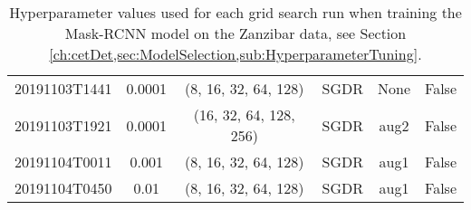 \begin{table}[!ht]
\begin{adjustbox}{width=\columnwidth, center}
\begin{tabular}{cccccc}
			20191103T1441 &       0.0001 &     (8, 16, 32, 64, 128) &      SGDR &                  None &                  False \\
			20191103T1921 &       0.0001 &   (16, 32, 64, 128, 256) &      SGDR &                  aug2 &                  False \\
			20191104T0011 &        0.001 &     (8, 16, 32, 64, 128) &      SGDR &                  aug1 &                  False \\
			20191104T0450 &         0.01 &     (8, 16, 32, 64, 128) &      SGDR &                  aug1 &                  False \\
			\bottomrule
		\end{tabular}
	\end{adjustbox}
\caption{Hyperparameter values used for each grid search run when training the Mask-RCNN model on the Zanzibar data, see Section \ref{ch:cetDet,sec:ModelSelection,sub:HyperparameterTuning}.}
\end{table}
